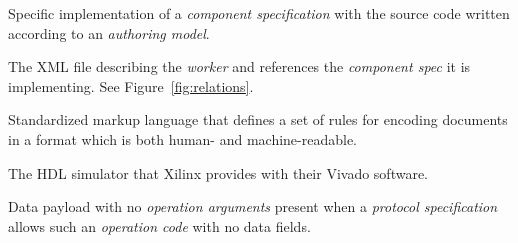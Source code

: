 \begin{description}[style=nextline]
\item[Worker]
Specific implementation of a \textit{component specification} with the source code written according to an \textit{authoring model}.

\item[Worker Description (OWD)]
The XML file describing the \textit{worker} and references the \textit{component spec} it is implementing. See Figure~\ref{fig:relations}.


\item[XML]
Standardized markup language that defines a set of rules for encoding documents in a format which is both human- and machine-readable.

\item[XSIM] The HDL simulator that Xilinx provides with their Vivado software.

\item[Zero Length Message]
Data payload with no \textit{operation arguments} present when a \textit{protocol specification} allows such an \textit{operation code} with no data fields.
\end{description}

